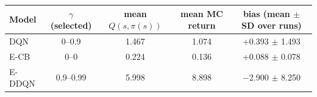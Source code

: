 \begin{tabular}{lcccc}
\toprule
Model & $\gamma$ (selected) & mean $Q(s,\pi(s))$ & mean MC return & bias (mean $\pm$ SD over runs) \\
\midrule
DQN & 0--0.9 & 1.467 & 1.074 & +0.393 $\pm$ 1.493 \\
E-CB & 0--0 & 0.224 & 0.136 & +0.088 $\pm$ 0.078 \\
E-DDQN & 0.9--0.99 & 5.998 & 8.898 & $-$2.900 $\pm$ 8.250 \\
\bottomrule
\end{tabular}
